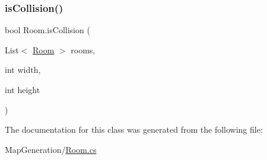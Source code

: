 \mbox{\label{class_room_ab08dbb20c76ccfd5580fc8243fdbedc6}} 
\subsubsection{\texorpdfstring{is\+Collision()}{isCollision()}\hspace{0.1cm}{\footnotesize\ttfamily [2/2]}}
{\footnotesize\ttfamily bool Room.\+is\+Collision (\begin{DoxyParamCaption}\item[{List$<$ \mbox{\hyperlink{class_room}{Room}} $>$}]{rooms,  }\item[{int}]{width,  }\item[{int}]{height }\end{DoxyParamCaption})}



The documentation for this class was generated from the following file\+:\begin{DoxyCompactItemize}
\item 
Map\+Generation/\mbox{\hyperlink{_room_8cs}{Room.\+cs}}\end{DoxyCompactItemize}

